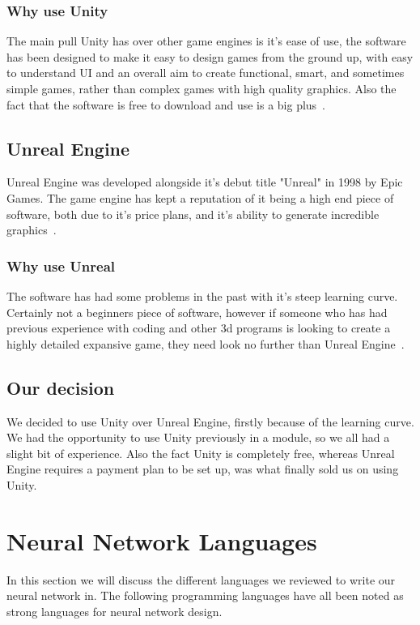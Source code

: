 \subsubsection{Why use Unity}
The main pull Unity has over other game engines is it's ease of use, the software has been designed to make it easy to design games from the ground up, with easy to understand UI and an overall aim to create functional, smart, and sometimes simple games, rather than complex games with high quality graphics. Also the fact that the software is free to download and use is a big plus~\cite{JoshPetty}.

\subsection{Unreal Engine}
Unreal Engine was developed alongside it's debut title "Unreal" in 1998 by Epic Games. The game engine has kept a reputation of it being a high end piece of software, both due to it's price plans, and it's ability to generate incredible graphics~\cite{unrealEngine4}.

\subsubsection{Why use Unreal}
The software has had some problems in the past with it's steep learning curve. Certainly not a beginners piece of software, however if someone who has had previous experience with coding and other 3d programs is looking to create a highly detailed expansive game, they need look no further than Unreal Engine~\cite{unrealEngine4Overview}.

\subsection{Our decision}
We decided to use Unity over Unreal Engine, firstly because of the learning curve. We had the opportunity to use Unity previously in a module, so we all had a slight bit of experience. Also the fact Unity is completely free, whereas Unreal Engine requires a payment plan to be set up, was what finally sold us on using Unity.

\section{Neural Network Languages}
In this section we will discuss the different languages we reviewed to write our neural network in. The following programming languages have all been noted as strong languages for neural network design.

